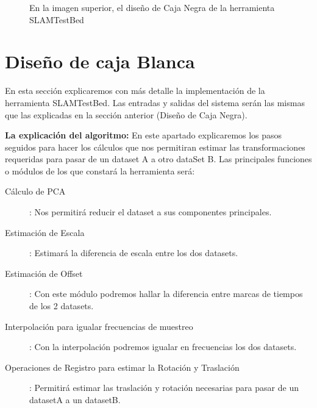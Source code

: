 \begin{figure}[H]
\begin{center}
\hspace{0.5cm}
\end{center}
\caption{ En la imagen superior, el diseño de Caja Negra de la herramienta SLAMTestBed }
\end{figure}

\section{Diseño de caja Blanca}
En esta sección explicaremos con más detalle la implementación de la herramienta SLAMTestBed.
Las entradas y salidas del sistema serán las mismas que las explicadas en la sección anterior (Diseño de Caja Negra).

\textbf{La explicación del algoritmo:}
En este apartado explicaremos los pasos seguidos para hacer los cálculos que nos permitiran estimar las transformaciones requeridas para pasar de un dataset A a otro dataSet B. 
Las principales funciones o módulos de los que constará la herramienta será:
\begin{description}
\item [Cálculo de PCA]: Nos permitirá reducir el dataset a  sus componentes principales.
\item [Estimación de Escala]: Estimará la diferencia de escala entre los dos datasets.
\item [Estimación de Offset]: Con este módulo podremos hallar la diferencia entre marcas de tiempos de los 2 datasets.
\item [Interpolación para igualar frecuencias de muestreo]: Con la interpolación podremos igualar en frecuencias los dos datasets.
\item [Operaciones de Registro para estimar la Rotación y Traslación]: Permitirá estimar las traslación y rotación necesarias para pasar de un datasetA a un datasetB.
\end{description}


